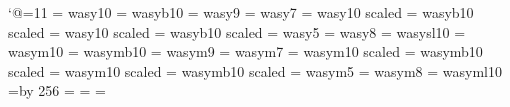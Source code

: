 \catcode`@=11 %
\ifx\newwasy\undefined
\font\tenwasy = wasy10
\font\wasyb = wasyb10
\font\ninewasy = wasy9
\font\sevenwasy = wasy7
\font\bigwasy = wasy10 scaled 
\font\bigwasyb = wasyb10 scaled 
\font\Bigwasy = wasy10 scaled 
\font\Bigwasyb = wasyb10 scaled 
\font\fivewasy = wasy5
\font\eightwasy = wasy8
\font\wasysl = wasysl10
\else
\font\tenwasy = wasym10
\font\wasyb = wasymb10
\font\ninewasy = wasym9
\font\sevenwasy = wasym7
\font\bigwasy = wasym10 scaled 
\font\bigwasyb = wasymb10 scaled 
\font\Bigwasy = wasym10 scaled 
\font\Bigwasyb = wasymb10 scaled 
\font\fivewasy = wasym5
\font\eightwasy = wasym8
\font\wasysl = wasyml10
\fi
\newfam\wasyfam
\newcount\wasyfamcount
\wasyfamcount=\wasyfam \multiply\wasyfamcount by 256
\def\wasy{\fam\wasyfam\tenwasy}
\textfont\wasyfam=\tenwasy
\scriptfont\wasyfam=\sevenwasy
\scriptscriptfont\wasyfam=\fivewasy
\def\wbf{\bf\let\tenwasy\wasyb}
\def\wsl{\sl\let\tenwasy\wasysl}
\def\euro{{\wasy\char"4E}}
\def\Paragraph{{\wasy\char"4D}}
\def\s{{\wasy\char"54}}
\def\z{{\wasy\char"4F}}
\def\applecmd{{\wasy\char"53}}
\def\overstrike#1#2{{\setbox0\hbox{$#2$}\hbox to \wd0{\hss
    $#1$\hss}\kern-\wd0\box0}}
\def\male{\hbox{\wasy\char"1A}}
\def\female{\hbox{\wasy\char"19}}
\def\currency{{\wasy\char"1B}}
\def\phone{{\wasy\char"07}}
\def\recorder{{\wasy\char"06}}
\def\clock{{\wasy\char"1C}}
\def\lightning{{\wasy\char"12}}
\def\pointer{{\wasy\char"09}}
\def\RIGHTarrow{{\wasy\char"11}}
\def\LEFTarrow{{\wasy\char"10}}
\def\UParrow{{\wasy\char"4B}}
\def\DOWNarrow{{\wasy\char"4C}}
\def\AC{\hbox{\kern0.5pt\wasy\char"3A\kern0.5pt}}
\def\HF{\lower0.9pt\hbox to 0pt{\kern0.5pt\wasy\char"3A\hss}%
        \raise0.9pt\hbox{\kern0.5pt\wasy\char"3A\kern0.5pt}}
\def\VHF{\hbox{\wasy\char"40}}
\def\Box{\hbox{\wasy\char"32}}\let\Square\Box
\def\XBox{\hbox{\wasy\char"34}}
\def\Diamond{\hbox{\wasy\char"33}}
\def\hexagon{\hbox{\wasy\char"37}}
\def\pentagon{\hbox{\wasy\char"44}}
\def\octagon{\hbox{\wasy\char"38}}
\def\varhexagon{\hbox{\wasy\char"39}}
\def\hexstar{\hbox{\wasy\char"41}}
\def\varhexstar{\hbox{\wasy\char"42}}
\def\davidsstar{\hbox{\wasy\char"43}}
\def\diameter{\hbox{\wasy\char"1F}}
\def\invdiameter{\hbox{\wasy\char"15}}
\def\varangle{\hbox{\wasy\char"1E}}
\def\lozenge{\hbox{\wasy\char"35}}
\def\kreuz{\hbox{\wasy\char"36}}
\def\smiley{\hbox{\wasy\char"2C}}
\def\frownie{\hbox{\wasy\char"2F}}
